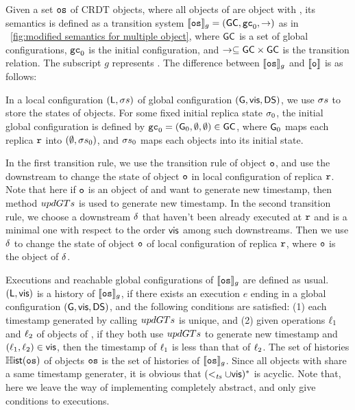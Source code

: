 Given a set $\mathtt{os}$ of CRDT objects, where all objects of \tonelin{} are object with \gts{}, its semantics is defined as a transition system $\llbracket \mathtt{os} \rrbracket_g = (\mathsf{GC},\mathtt{gc}_0,\rightarrow)$ as in \figurename~\ref{fig:modified semantics for multiple object}, where $\mathsf{GC}$ is a set of global configurations, $\mathtt{gc}_0$ is the initial configuration, and $\rightarrow\subseteq \mathsf{GC}  \times \mathsf{GC}$ is the transition relation. The subscript $g$ represents \gts{}. The difference between $\llbracket \mathtt{os} \rrbracket_g$ and $\llbracket \mathtt{o} \rrbracket$ is as follows:

In a local configuration $(\mathsf{L}, \sigma s)$ of global configuration $(\mathsf{G}, \mathsf{vis}, \mathsf{DS})$, we use $\sigma s$ to store the states of objects. For some fixed initial replica state $\sigma_0$, the initial global configuration is defined by $\mathtt{gc}_0 = (\mathsf{G}_0, \emptyset, \emptyset) \in \mathsf{GC}$, where $\mathsf{G}_0$ maps each replica $\mathtt{r}$ into $(\emptyset, \sigma s_0)$, and $\sigma s_0$ maps each objects into its initial state.

In the first transition rule, we use the transition rule of object $\mathtt{o}$, and use the downstream to change the state of object $\mathtt{o}$ in local configuration of replica $\mathtt{r}$. Note that here if $\mathtt{o}$ is an object of \tonelin{} and want to generate new timestamp, then method $updGTs$ is used to generate new timestamp. In the second transition rule, we choose a downstream $\delta$ that haven't been already executed at $\mathtt{r}$ and is a minimal one with respect to the order $\mathsf{vis}$ among such downstreams. Then we use $\delta$ to change the state of object $\mathtt{o}$ of local configuration of replica $\mathtt{r}$, where $\mathtt{o}$ is the object of $\delta$.

Executions and reachable global configurations of $\llbracket \mathtt{os} \rrbracket_g$ are defined as usual. $(\mathsf{L},\mathsf{vis})$ is a history of $\llbracket \mathtt{os} \rrbracket_g$, if there exists an execution $e$ ending in a global configuration $(\mathsf{G}, \mathsf{vis}, \mathsf{DS})$, and the following conditions are satisfied: (1) each timestamp generated by calling $updGTs$ is unique, and (2) given operations $\ell_1$ and $\ell_2$ of objects of \tonelin{}, if they both use $updGTs$ to generate new timestamp and $(\ell_1,\ell_2) \in \mathsf{vis}$, then the timestamp of $\ell_1$ is less than that of $\ell_2$. The set of histories $\mathbb{H}\mathsf{ist}(\mathtt{os})$ of objects $\mathtt{os}$ is the set of histories of $\llbracket \mathtt{os} \rrbracket_g$. Since all objects with \gts{} share a same timestamp generater, it is obvious that $(<_{\mathit{ts}} \cup \mathsf{vis})^*$ is acyclic. Note that, here we leave the way of implementing \gts{} completely abstract, and only give conditions to executions.

